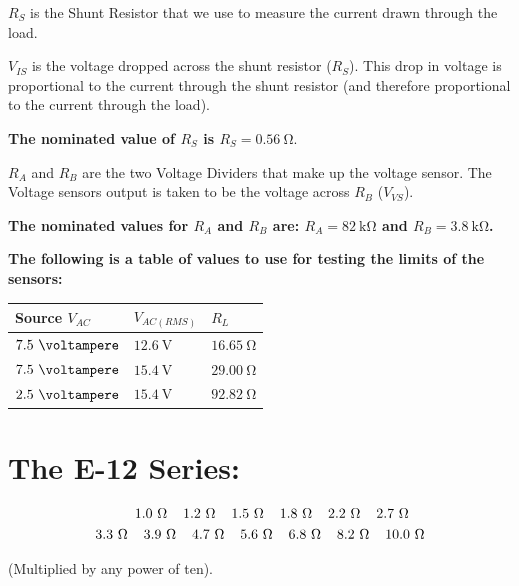 \documentclass[a4paper,12pt]{article}
\begin{document}
\vspace{7mm}

$R_S$ is the Shunt Resistor that we use to measure the current drawn through the load. 

${V_{IS}}$  is the voltage dropped across the shunt resistor ($R_{S}$). 
This drop in voltage is proportional to the current through the shunt resistor 
(and therefore proportional to the current through the load). \medskip

\textbf{The nominated value of $R_S$ is $R_S = 0.56\ \si{\ohm}$}. \medskip


$R_A$ and $R_B$ are the two Voltage Dividers that make up the voltage sensor.
The Voltage sensors output is taken to be the voltage across $R_B$ ($V_{VS}$). \medskip

\textbf{
	The nominated values for $R_A$ and $R_B$ are:
	$R_A = 82\ \si{\kilo\ohm}$ and $R_B = 3.8\ \si{\kilo\ohm}$.
} \medskip


\textbf{The following is a table of values to use for testing the limits of the sensors:}
\medskip

\begin{table}[H]
 \centering
 \renewcommand\arraystretch{2}
 \begin{tabular}{p{4cm} p{4cm} p{2cm}}

 \toprule
 Source $V_{AC}$ & $V_{AC(RMS)}$ & $R_L$ \\
 \toprule
 $7.5\ \si{\voltampere}$ & $12.6\ \si{\volt}$ & $16.65\ \si{\ohm}$ \\
 $7.5\ \si{\voltampere}$ & $15.4\ \si{\volt}$ & $29.00\ \si{\ohm}$ \\
 $2.5\ \si{\voltampere}$ & $15.4\ \si{\volt}$ & $92.82\ \si{\ohm}$ \\
 \bottomrule
 \end{tabular}
\end{table}


\clearpage

\section{The E-12 Series:}
\hypertarget{LINK_E12}{}

\begin{align*}
	1.0\ \si{\ohm} \hspace{4mm} 
	1.2\ \si{\ohm} \hspace{4mm} 
	1.5\ \si{\ohm} \hspace{4mm} 
	1.8\ \si{\ohm} \hspace{4mm} 
	2.2\ \si{\ohm} \hspace{4mm} 
	2.7\ \si{\ohm} \hspace{4mm} \\
	3.3\ \si{\ohm} \hspace{4mm} 
	3.9\ \si{\ohm} \hspace{4mm} 
	4.7\ \si{\ohm} \hspace{4mm} 
	5.6\ \si{\ohm} \hspace{4mm} 
	6.8\ \si{\ohm} \hspace{4mm} 
	8.2\ \si{\ohm} \hspace{4mm} 
	10.0 \ \si{\ohm}
\end{align*}

(Multiplied by any power of ten).
\end{document}
